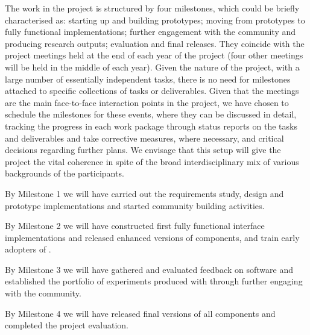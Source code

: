 
The work in the \TheProject project is structured by four milestones,
which could be briefly characterised as:
starting up and building prototypes; 
moving from prototypes to fully functional implementations; 
further engagement with the community and producing research outputs; 
evaluation and final releases. They coincide with the project meetings 
held at the end of each year of the project (four other meetings will 
be held in the middle of each year). 
Given the nature of the project, with a
large number of essentially independent tasks, there is no need for
milestones attached to specific collections of tasks or
deliverables.
Given that the meetings are the main
face-to-face interaction points in the project, we have chosen to
schedule the milestones for these events, where they can be discussed
in detail, tracking the progress in each work package through status
reports on the tasks and deliverables and take corrective measures,
where necessary, and critical decisions regarding further plans.
We envisage that this setup will give the project the vital coherence
in spite of the broad interdisciplinary mix of various backgrounds of the
participants.

\begin{milestones}
  {By Milestone 1 we will have carried out the requirements study, design and prototype implementations and started community building activities.}

  {By Milestone 2 we will have constructed first fully functional interface implementations and released enhanced versions of \TheProject components, and train early adopters of \TheProject.}

  {By Milestone 3 we will have gathered and evaluated feedback on \TheProject software and established the portfolio of experiments produced with \TheProject through further engaging with the community.}

  {By Milestone 4 we will have released final versions of all \TheProject components and completed the project evaluation.}
\end{milestones}



